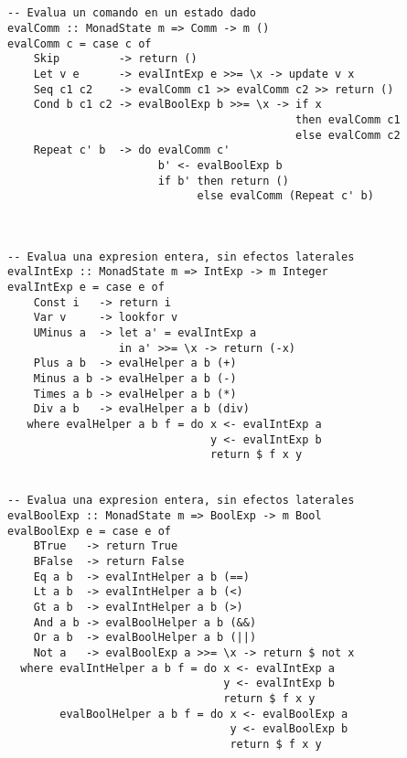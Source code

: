 \documentclass[a4paper]{report}
\begin{document}
\begin{lstlisting}


-- Evalua un comando en un estado dado
evalComm :: MonadState m => Comm -> m ()
evalComm c = case c of
    Skip         -> return ()
    Let v e      -> evalIntExp e >>= \x -> update v x
    Seq c1 c2    -> evalComm c1 >> evalComm c2 >> return ()
    Cond b c1 c2 -> evalBoolExp b >>= \x -> if x 
                                            then evalComm c1
                                            else evalComm c2
    Repeat c' b  -> do evalComm c'
                       b' <- evalBoolExp b
                       if b' then return ()
                             else evalComm (Repeat c' b)



-- Evalua una expresion entera, sin efectos laterales
evalIntExp :: MonadState m => IntExp -> m Integer
evalIntExp e = case e of
    Const i   -> return i
    Var v     -> lookfor v
    UMinus a  -> let a' = evalIntExp a
                 in a' >>= \x -> return (-x)
    Plus a b  -> evalHelper a b (+)
    Minus a b -> evalHelper a b (-)
    Times a b -> evalHelper a b (*)
    Div a b   -> evalHelper a b (div)
   where evalHelper a b f = do x <- evalIntExp a
                               y <- evalIntExp b
                               return $ f x y


-- Evalua una expresion entera, sin efectos laterales
evalBoolExp :: MonadState m => BoolExp -> m Bool
evalBoolExp e = case e of
    BTrue   -> return True
    BFalse  -> return False
    Eq a b  -> evalIntHelper a b (==)
    Lt a b  -> evalIntHelper a b (<)
    Gt a b  -> evalIntHelper a b (>)
    And a b -> evalBoolHelper a b (&&)
    Or a b  -> evalBoolHelper a b (||)
    Not a   -> evalBoolExp a >>= \x -> return $ not x
  where evalIntHelper a b f = do x <- evalIntExp a
                                 y <- evalIntExp b
                                 return $ f x y
        evalBoolHelper a b f = do x <- evalBoolExp a
                                  y <- evalBoolExp b
                                  return $ f x y

\end{lstlisting}

\pagebreak
\end{document}
